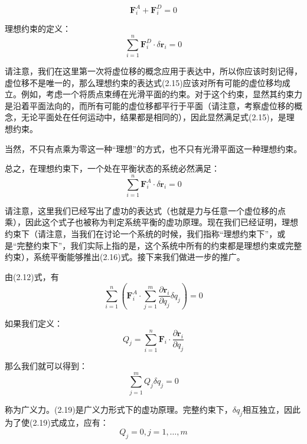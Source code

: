 \documentclass[a4paper, 10pt, openany]{book}%
\begin{document}
   \begin{equation}
     \textbf{F}^A_i+\textbf{F}^D_i=0
    \end{equation}

   理想约束的定义：
   \begin{equation}
    \sum_{i=1}^n \textbf{F}^D_i\cdot\delta \textbf{r}_i=0
   \end{equation}

请注意，我们在这里第一次将虚位移的概念应用于表达中，所以你应该时刻记得，虚位移不是唯一的，那么理想约束的表达式(2.15)应该对所有可能的虚位移均成立。例如，考虑一个将质点束缚在光滑平面的约束。对于这个约束，显然其约束力是沿着平面法向的，而所有可能的虚位移都平行于平面（请注意，考察虚位移的概念，无论平面处在任何运动中，结果都是相同的），因此显然满足式(2.15)，是理想约束。

当然，不只有点乘为零这一种“理想”的方式，也不只有光滑平面这一种理想约束。




   总之，在理想约束下，一个处在平衡状态的系统必然满足：
   \begin{equation}
    \sum_{i=1}^n \textbf{F}^A_i\cdot\delta \textbf{r}_i=0
   \end{equation}
   
   请注意，这里我们已经写出了虚功的表达式（也就是力与任意一个虚位移的点乘），因此这个式子也被称为判定系统平衡的虚功原理。现在我们已经证明，理想约束下（请注意，当我们在讨论一个系统的时候，我们指称“理想约束下”，或是“完整约束下”，我们实际上指的是，这个系统中所有的约束都是理想约束或完整约束），系统平衡能够推出(2.16)式。接下来我们做进一步的推广。


   由(2.12)式，有
   \begin{equation}
    \sum_{i=1}^n(\textbf{F}^A_i \cdot \sum_{j=1}^m \frac{\partial \textbf{r}_i}{\partial q_j}\delta q_j)=0
   \end{equation}
  
   如果我们定义：
   \begin{equation}
   Q_j=\sum_{i=1}^n \textbf{F}_i \cdot \frac{\partial \textbf{r}_i}{\partial q_j}
   \end{equation}

   那么我们就可以得到：
   \begin{equation}
    \sum_{j=1}^m Q_j \delta q_j=0
   \end{equation}
   
   称为广义力。(2.19)是广义力形式下的虚功原理。完整约束下，$\delta q_j $相互独立，因此为了使(2.19)式成立，应有：
   \begin{equation}
     Q_j=0,j=1,\dots,m
   \end{equation}
\end{document}
